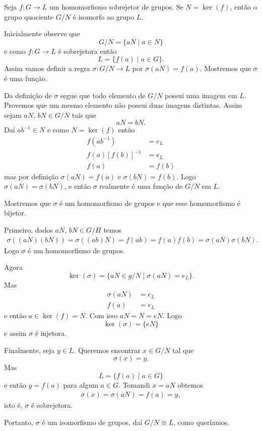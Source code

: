 \begin{teorema}\label{primeiro_teorema_homomorfismo}
    Seja $f : G \to L$ um homomorfismo sobrejetor de grupos. Se $N = \ker(f)$, então o grupo quociente $G/N$ é isomorfo ao grupo $L$.
\end{teorema}
\begin{prova}
    Inicialmente observe que
    \[
        G/N = \{aN \mid a \in N\}
    \]
    e como $f : G \to L$ é sobrejetora então
    \[
        L = \{f(a) \mid a \in G\}.
    \]
    Assim vamos definir a regra $\sigma : G/N \to L$ por $\sigma(aN) = f(a)$. Mostremos que $\sigma$ é uma função.

    Da definição de $\sigma$ segue que todo elemento de $G/N$ possui uma imagem em $L$. Provemos que um mesmo elemento não possui duas imagens distintas. Assim sejam $aN$, $bN \in G/N$ tais que
    \[
        aN = bN.
    \]
    Daí $ab^{-1} \in N$ e como $N = \ker(f)$ então
    \begin{align*}
        f(ab^{-1}) &= e_L\\
        f(a)[f(b)]^{-1} &= e_L\\
        f(a) &= f(b)
    \end{align*}
    mas por definição $\sigma(aN) = f(a)$ e $\sigma(bN) = f(b)$. Logo $\sigma(aN) = \sigma(bN)$, e então $\sigma$ realmente é uma função de $G/N$ em $L$.

    Mostremos que $\sigma$ é um homomorfismo de grupos e que esse homomorfismo é bijetor.

    Primeiro, dados $aN$, $bN \in G/H$ temos
    \begin{align*}
        \sigma((aN)(bN)) = \sigma((ab)N) = f(ab) = f(a)f(b) = \sigma(aN)\sigma(bN).
    \end{align*}
    Logo $\sigma$ é um homomorfismo de grupos.

    Agora
    \[
        \ker(\sigma) = \{aN \in g/N \mid \sigma(aN) = e_L\}.
    \]
    Mas
    \begin{align*}
        \sigma(aN) &= e_L\\
        f(a) &= e_L
    \end{align*}
    e então $a \in \ker(f) = N$. Com isso $aN = N = eN$. Logo
    \[
        \ker(\sigma) = \{eN\}
    \]
    e assim $\sigma$ é injetora.

    Finalmente, seja $y \in L$. Queremos encontrar $x \in G/N$ tal que
    \[
        \sigma(x) = y.
    \]
    Mas
    \[
        L = \{f(a) \mid a \in G\}
    \]
    e então $y = f(a)$ para algum $a \in G$. Tomandi $x = aN$ obtemos
    \begin{align*}
        \sigma(x) = \sigma(aN) = f(a) = y,
    \end{align*}
    isto é, $\sigma$ é sobrejetora.

    Portanto, $\sigma$ é um isomorfismo de grupos, daí $G/N \cong L$, como queríamos.
\end{prova}


